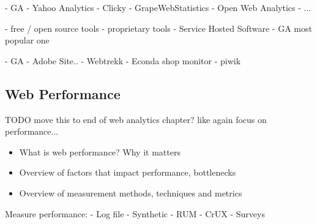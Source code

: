 


- GA
- Yahoo Analytics
- Clicky
- GrapeWebStatistics
- Open Web Analytics
- ...


- free / open source tools
- proprietary tools
- Service Hosted Software
- GA most popular one





- GA
- Adobe Site..
- Webtrekk
- Econda shop monitor
- piwik








\subsection{Web Performance}
TODO move this to end of web analytics chapter? like again focus on performance...
\begin{itemize}
\item What is web performance? Why it matters
\item Overview of factors that impact performance, bottlenecks
\item Overview of measurement methods, techniques and metrics
\end{itemize}









Measure performance:
- Log file
- Synthetic
- RUM
- CrUX
- Surveys











